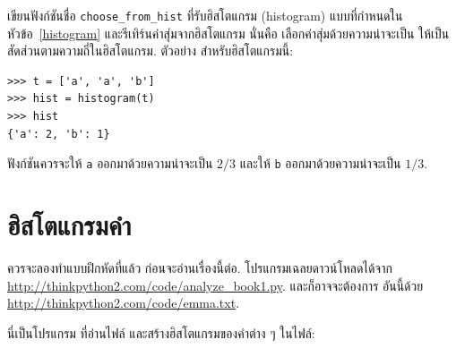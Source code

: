 \begin{exercise}


เขียนฟังก์ชันชื่อ \verb|choose_from_hist|
ที่รับฮิสโตแกรม (histogram) แบบที่กำหนดในหัวข้อ~\ref{histogram}
และรีเทิร์นค่าสุ่มจากฮิสโตแกรม
นั่นคือ เลือกค่าสุ่มด้วยความน่าจะเป็น ให้เป็นสัดส่วนตามความถี่ในฮิสโตแกรม.
ตัวอย่าง สำหรับฮิสโตแกรมนี้:

\begin{verbatim}
>>> t = ['a', 'a', 'b']
>>> hist = histogram(t)
>>> hist
{'a': 2, 'b': 1}
\end{verbatim}
%
%
ฟังก์ชันควรจะให้ \verb|a| ออกมาด้วยความน่าจะเป็น $2/3$ 
และให้ \verb|b| ออกมาด้วยความน่าจะเป็น $1/3$.
%
\end{exercise}


\section{ฮิสโตแกรมคำ}


ควรจะลองทำแบบฝึกหัดที่แล้ว ก่อนจะอ่านเรื่องนี้ต่อ.
โปรแกรมเฉลยดาวน์โหลดได้จาก
\url{http://thinkpython2.com/code/analyze_book1.py}.
และก็อาจจะต้องการ อันนี้ด้วย
\url{http://thinkpython2.com/code/emma.txt}.


นี่เป็นโปรแกรม ที่อ่านไฟล์ และสร้างฮิสโตแกรมของคำต่าง ๆ ในไฟล์:

